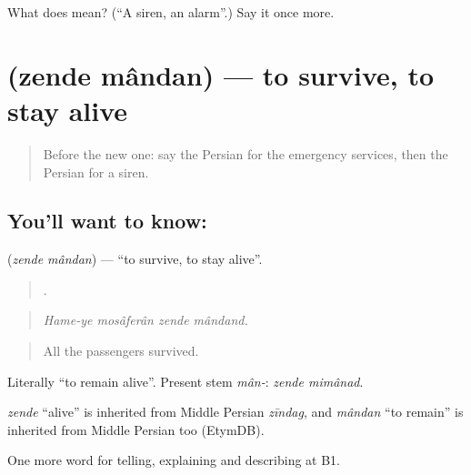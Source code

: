 \begin{tcolorbox}[breakable,colback=teal!4,colframe=teal!35!black,title={Before you move on}]
What does  mean? (\textquotedblleft{}A siren, an alarm\textquotedblright{}.) Say it once more.
\end{tcolorbox}
\section[\texorpdfstring{\fa{زنده} \fa{ماندن} (zende mândan)}{زنده ماندن (zende mândan)}]{  (zende mândan) — to survive, to stay alive}

\label{lesson:FA-C327-zende-mandan}



\begin{quote}
Before the new one: say the Persian for the emergency services, then the Persian for a siren.
\end{quote}

\subsection*{You'll want to know:  }
\textbf{ } (\emph{zende mândan}) — \textquotedblleft{}to survive, to stay alive\textquotedblright{}.

\begin{quote}
   .
\end{quote}

\begin{quote}
\emph{Hame-ye mosâferân zende mândand.}
\end{quote}

\begin{quote}
All the passengers survived.
\end{quote}

Literally \textquotedblleft{}to remain alive\textquotedblright{}. Present stem \emph{mân-}: \emph{zende mimânad}.

\begin{cousinweb}
\emph{zende} \textquotedblleft{}alive\textquotedblright{} is inherited from Middle Persian \emph{zīndag}, and \emph{mândan} \textquotedblleft{}to remain\textquotedblright{} is inherited from Middle Persian too (EtymDB).
\end{cousinweb}

\begin{grammarlens}[title={What you've built}]
One more word for telling, explaining and describing at B1.
\end{grammarlens}

